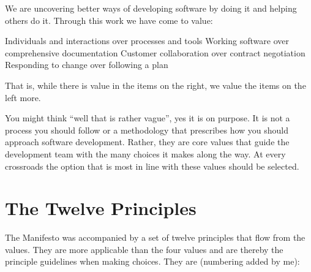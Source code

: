 \documentclass[]{book}
\begin{document}
We are uncovering better ways of developing software by doing it and helping others do it. Through this work we have come to value:

Individuals and interactions over processes and tools
Working software over comprehensive documentation
Customer collaboration over contract negotiation
Responding to change over following a plan

That is, while there is value in the items on the right, we value the items on the left more.

You might think ``well that is rather vague'', yes it is on purpose. It is not a process you should follow or a methodology that prescribes how you should approach software development. Rather, they are core values that guide the development team with the many choices it makes along the way. At every crossroads the option that is most in line with these values should be selected.

\hypertarget{the-twelve-principles}{%
\section{The Twelve Principles}\label{the-twelve-principles}}

The Manifesto was accompanied by a set of twelve principles that flow from the values. They are more applicable than the four values and are thereby the principle guidelines when making choices. They are (numbering added by me):
\end{document}
